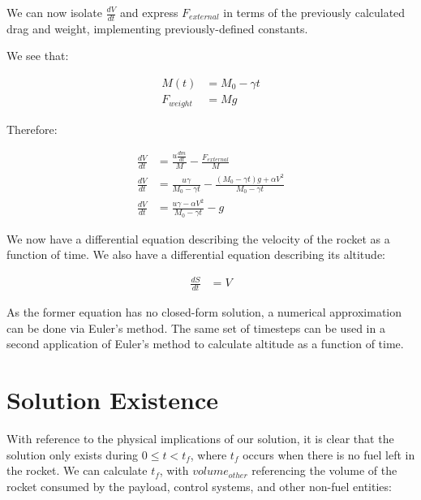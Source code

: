 \documentclass[]{article}
\begin{document}
\newpage
We can now isolate $\frac{dV}{dt}$ and express $F_{external}$ in terms of the previously calculated drag and weight, implementing previously-defined constants.

We see that:

\begin{center}
	\begin{align*}
	M(t) &= M_0 - \gamma t \\
	F_{weight} &= Mg
	\end{align*}
\end{center}

Therefore:

\begin{center}
	\begin{align*}
	\frac{dV}{dt} &= \frac{u \frac{dm}{dt}}{M} - \frac{F_{external}}{M}  \\
	\frac{dV}{dt} &= \frac{u\gamma}{M_0 - \gamma t} - \frac{(M_0 - \gamma t)g + \alpha V^2}{M_0 - \gamma t} \\
	\frac{dV}{dt} &= \frac{u\gamma - \alpha V^2}{M_0 - \gamma t} - g
	\end{align*}
\end{center}

We now have a differential equation describing the velocity of the rocket as a function of time. We also have a differential equation describing its altitude:

\begin{center}
	\begin{align*}
	\frac{dS}{dt} &= V
	\end{align*}
\end{center}

As the former equation has no closed-form solution, a numerical approximation can be done via Euler's method. The same set of timesteps can be used in a second application of Euler's method to calculate altitude as a function of time.

\section{Solution Existence}

With reference to the physical implications of our solution, it is clear that the solution only exists during $0 \le t < t_{f}$, where $t_f$ occurs when there is no fuel left in the rocket. We can calculate $t_f$, with $volume_{other}$ referencing the volume of the rocket consumed by the payload, control systems, and other non-fuel entities:
\end{document}
